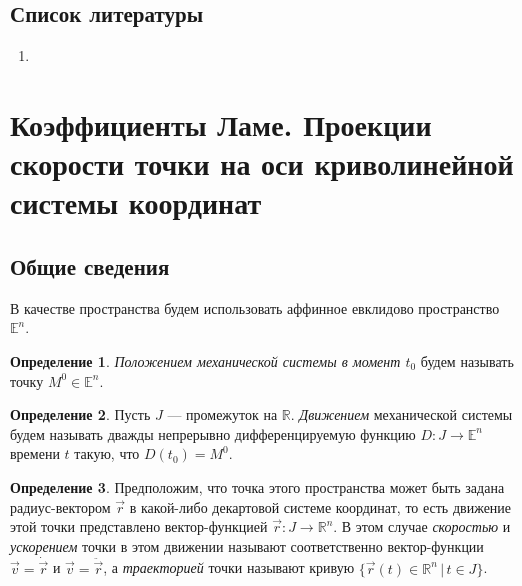 \documentclass{article}
\theoremstyle{definition}
\newtheorem{definition}{Определение}[section]
\theoremstyle{plain}
\theoremstyle{remark}
\numberwithin{equation}{section}
\begin{document}
\subsection{Список литературы}
\begin{enumerate}
  \item \cite{lectures}
\end{enumerate}

\pagebreak


\section{Коэффициенты Ламе. Проекции скорости точки на оси криволинейной
системы координат}

\subsection{Общие сведения}

В качестве пространства будем использовать аффинное евклидово пространство
$\mathbb{E}^n$.

\begin{definition}
  \textit{Положением механической системы в момент $t_0$} будем называть точку
  $M^0 \in \mathbb{E}^n$.
\end{definition}

\begin{definition}
  Пусть $J$ --- промежуток на $\mathbb{R}$. \textit{Движением} механической
  системы будем называть дважды непрерывно дифференцируемую функцию $D : J \to
  \mathbb{E}^n$ времени $t$ такую, что $D(t_0) = M^0$.
\end{definition}

\begin{definition}
  Предположим, что точка этого пространства может быть задана радиус-вектором
  $\vec{r}$ в какой-либо декартовой системе координат, то есть движение этой
  точки представлено вектор-функцией $\vec{r} : J \to \mathbb{R}^n$. В этом
  случае \textit{скоростью} и \textit{ускорением} точки в этом движении
  называют соответственно вектор-функции $\vec{v} = \dot{\vec{r}}$ и
  $\vec{v} = \ddot{\vec{r}}$, а \textit{траекторией} точки называют кривую
  $\{ \vec{r}(t) \in \mathbb{R}^n \, | \, t \in J \}$.
\end{definition}

\end{document}
